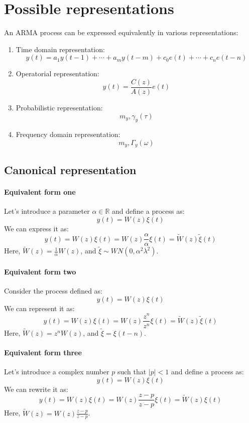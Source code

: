 \section{Possible representations}

An ARMA process can be expressed equivalently in various representations:
\begin{enumerate}
    \item Time domain representation: 
        \[y(t)=a_1y(t-1)+\cdots+a_m y(t-m)+c_0e(t)+\cdots+c_n e(t-n) \]
    \item Operatorial representation: 
        \[y(t)=\dfrac{C(z)}{A(z)}e(t)\]
    \item Probabilistic representation: 
        \[m_y,\gamma_y(\tau)\]
    \item Frequency domain representation: 
        \[m_y,\Gamma_y(\omega)\]
\end{enumerate}

\subsection{Canonical representation}
\paragraph*{Equivalent form one}
Let's introduce a parameter $\alpha \in \mathbb{R}$ and define a process as:
\[y(t)=W(z)\xi(t)\]
We can express it as:
\[y(t)=W(z)\xi(t)=W(z)\dfrac{\alpha}{\alpha}\xi(t)=\tilde{W}(z)\tilde{\xi}(t)\]
Here, $\tilde{W}(z)=\frac{1}{\alpha}W(z)$, and $\tilde{\xi}\sim WN(0,\alpha^2\lambda^2)$. 

\paragraph*{Equivalent form two}
Consider the process defined as:
\[y(t)=W(z)\xi(t)\]
We can represent it as:
\[y(t)=W(z)\xi(t)=W(z)\dfrac{z^n}{z^n}\xi(t)=\tilde{W}(z)\tilde{\xi}(t)\]
Here, $\tilde{W}(z)=z^n W(z)$, and $\tilde{\xi}=\xi(t-n)$. 

\paragraph*{Equivalent form three}
Let's introduce a complex number $p$ such that $\left\lvert p \right\rvert < 1$ and define a process as:
\[y(t)=W(z)\xi(t)\]
We can rewrite it as:
\[y(t)=W(z)\xi(t)=W(z)\dfrac{z-p}{z-p}\xi(t)=\tilde{W}(z)\xi(t)\]
Here, $\tilde{W}(z)=W(z)\frac{z-p}{z-p}$. 

